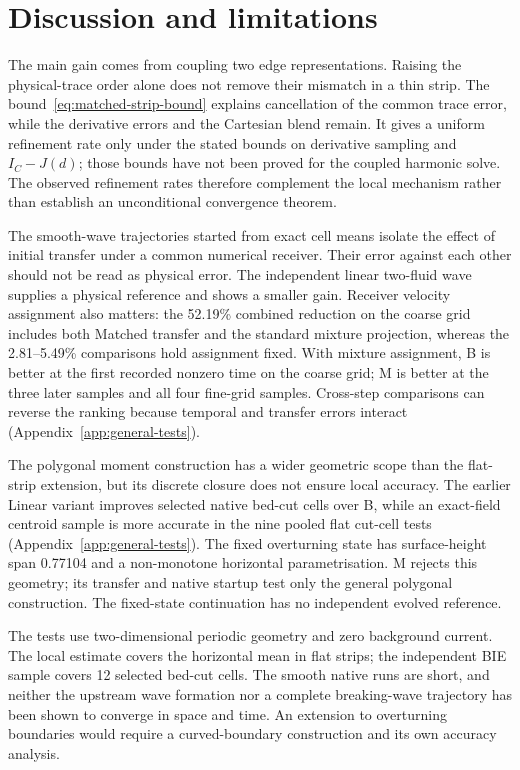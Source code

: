 \documentclass[10pt]{article}
\begin{document}
\section{Discussion and limitations}
The main gain comes from coupling two edge representations. Raising the
physical-trace order alone does not remove their mismatch in a thin strip.
The bound~\eqref{eq:matched-strip-bound} explains cancellation of the
common trace error, while the derivative errors and the Cartesian blend
remain. It gives a uniform refinement rate only under the stated bounds
on derivative sampling and $I_C-J(d)$; those bounds have not been proved
for the coupled harmonic solve. The observed refinement rates therefore complement the local mechanism
rather than establish an unconditional convergence theorem.

The smooth-wave trajectories started from exact cell means isolate the
effect of initial transfer under a common numerical receiver. Their error
against each other should not be read as physical error. The independent
linear two-fluid wave supplies a physical reference and shows a smaller
gain. Receiver velocity assignment also matters: the 52.19\% combined
reduction on the coarse grid includes both Matched transfer and the standard
mixture projection, whereas the 2.81--5.49\% comparisons hold assignment
fixed. With mixture assignment, B is better at the first recorded nonzero
time on the coarse grid; M is better at the three later samples and all
four fine-grid samples. Cross-step comparisons can reverse
the ranking because temporal and transfer errors interact
(Appendix~\ref{app:general-tests}).

The polygonal moment construction has a wider geometric scope than the
flat-strip extension, but its discrete closure does not ensure local
accuracy. The earlier Linear variant improves selected native bed-cut
cells over B, while an exact-field centroid sample is more accurate in
the nine pooled flat cut-cell tests (Appendix~\ref{app:general-tests}).
The fixed overturning state has surface-height span 0.77104 and a
non-monotone horizontal parametrisation. M rejects this geometry; its
transfer and native startup test only the general polygonal construction.
The fixed-state continuation has no independent evolved reference.

The tests use two-dimensional periodic geometry and zero background
current. The local estimate covers the horizontal mean in flat strips;
the independent BIE sample covers 12 selected bed-cut cells. The smooth
native runs are short, and neither the upstream wave formation nor a
complete breaking-wave trajectory has been shown to converge in space
and time. An extension to overturning boundaries would require a
curved-boundary construction and its own accuracy analysis.
\end{document}
